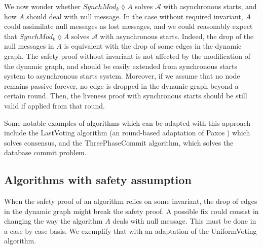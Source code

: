 \documentclass{article}
\begin{document}
We now wonder whether $SynchMod_k \lozenge A$ solves $\mathcal{A}$ with asynchronous starts, and how $A$ should deal with null message.
In the case without required invariant, $A$ could assimilate null messages as lost messages,
and we could reasonably expect that $SynchMod_k \lozenge A$ solves $\mathcal{A}$ with asynchronous starts.
Indeed, the drop of the null messages in $A$ is equivalent with the drop of some edges in the dynamic graph.
The safety proof without invariant is not affected by the modification of the dynamic graph, and should be easily extended from synchronous starts system to asynchronous starts system.
Moreover, if we assume that no node remains passive forever, no edge is dropped in the dynamic graph beyond a certain round.
Then, the liveness proof with synchronous starts should be still valid if applied from that round.

Some notable examples of algorithms which can be adapted with this approach include the LastVoting \cite{CBS09} algorithm (an round-based adaptation of Paxos \cite{paxos}) which solves consensus,
and the ThreePhaseCommit \cite{BT93} algorithm, which solves the database commit problem.

\subsection{Algorithms with safety assumption}

When the safety proof of an algorithm relies on some invariant, the drop of edges in the dynamic graph might break the safety proof.
A possible fix could consist in changing the way the algorithm $A$ deals with null message. This must be done in a case-by-case basis.
We exemplify that with an adaptation of the UniformVoting \cite{CBS09} \cite{Ben83} algorithm.
\end{document}
